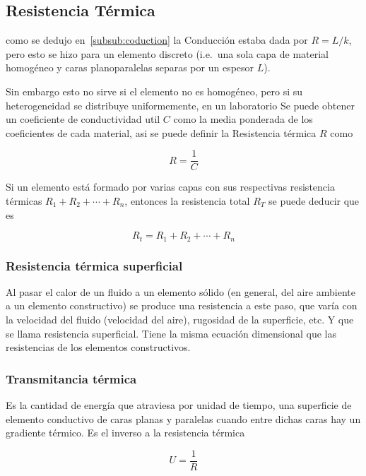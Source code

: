 \subsection{Resistencia Térmica}
como se dedujo en~\ref{subsub:coduction} la Conducción
estaba dada por $R = L/k$, pero esto
se hizo para un elemento discreto (i.e.\ una sola capa
de material homogéneo y caras planoparalelas separas por
un espesor $L$).

Sin embargo esto no sirve si el elemento 
no es homogéneo, pero si su heterogeneidad se distribuye
uniformemente, en un laboratorio Se
puede obtener un coeficiente de conductividad
util $C$ como la media ponderada de los 
coeficientes de cada material, asi se puede
definir la Resistencia térmica $R$ como

\begin{equation}
    \label{eq:resistencia-het}
    R = \frac{1}{C}
\end{equation}

Si un elemento está formado por varias
capas con sus respectivas resistencia térmicas
$R_1 + R_2 + \cdots + R_n$,
entonces la resistencia total $R_T$ se puede
deducir que es

\begin{equation}
    \label{eq:resistencia-total}
    R_t = R_1 + R_2 + \cdots + R_n
\end{equation}

\subsubsection{Resistencia térmica superficial}
Al pasar el calor de un fluido a un elemento sólido (en general, del aire ambiente a un elemento constructivo) se produce una resistencia a este paso, que varía con la velocidad del fluido (velocidad del aire), rugosidad de la superficie, etc.
Y que se llama resistencia superficial. Tiene la misma ecuación dimensional que las resistencias de los elementos constructivos.

\subsubsection{Transmitancia térmica}
Es la cantidad de energía que atraviesa por 
unidad de tiempo, una superficie
de elemento conductivo de caras planas y paralelas
cuando entre dichas caras hay un gradiente térmico.
Es el inverso a la resistencia térmica

\begin{equation}
    \label{eq:transmitancia}
    U = \frac{1}{R}
\end{equation}

